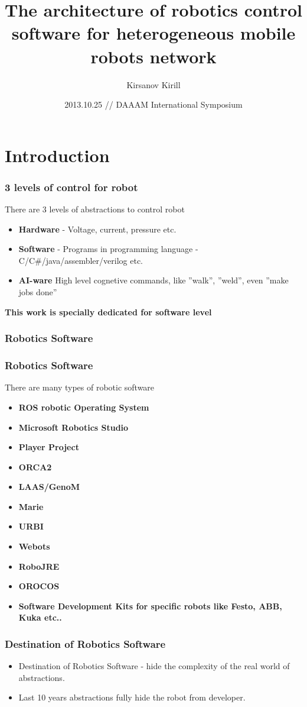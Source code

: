 \documentclass{beamer}
\title{The architecture of robotics control software for heterogeneous mobile
robots network}
\author {Kirsanov Kirill\inst{1} \inst{2}}
\institute
{
\inst{1}
Laboratory "Sensorika", Miusskaya sq., 4, 125047, Moscow, Russia
\and
\inst{2}
Moscow state technological University 'Stankin', Vadkovsky per. 3a, 101472,
Moscow, Russia

}
\date{2013.10.25 // DAAAM International Symposium}
\begin{document}
\begin{frame}
\titlepage
\end{frame}

\section{Introduction}
\begin{frame}
\frametitle{3 levels of control for robot}
There are 3 levels of abstractions to control robot
\begin{itemize}
	\item<1>{\textbf{Hardware} - Voltage, current, pressure etc.} 
	\item<1>{\textbf{Software} - Programs in programming language -
	C/C#/java/assembler/verilog etc.}
	\item<1>{\textbf{AI-ware} High level cognetive commands, like ''walk'',
	''weld'', even ''make jobs done''}
\end{itemize}
\textbf{This work is specially dedicated for software level}
\end{frame}


\subsubsection{Robotics Software}
\begin{frame}
\frametitle{Robotics Software}
There are many types of robotic software
\begin{itemize}
\item<1> \textbf{ROS robotic Operating System}
\item<1> \textbf{Microsoft Robotics Studio} 
\item<1> \textbf{Player Project} 
\item<1> \textbf{ORCA2} 
\item<1> \textbf{LAAS/GenoM} 
\item<1> \textbf{Marie} 
\item<1> \textbf{URBI} 
\item<1> \textbf{Webots} 
\item<1> \textbf{RoboJRE}
\item<1> \textbf{OROCOS}
\item<1> \textbf{Software Development Kits for specific robots like Festo, ABB,
Kuka etc..}
\end{itemize}
\end{frame}

\begin{frame}
\frametitle{Destination of Robotics Software}
\begin{itemize}
\item Destination of Robotics Software - hide the complexity of the real
world of abstractions.
\item Last 10 years abstractions fully hide the robot from developer.
\end{itemize}
\end{frame}
\end{document}
